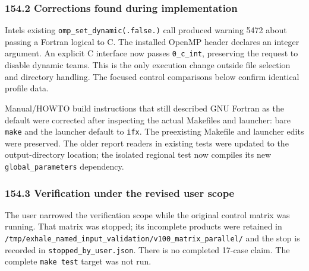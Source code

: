 \documentclass[english,a4paper]{my_memo}
\begin{document}
\subsubsection{154.2 Corrections found during implementation}\label{1542-corrections-found-during-implementation}

Intel\textquotesingle s existing \texttt{omp\_set\_dynamic(.false.)} call produced warning 5472 about
passing a Fortran logical to C. The installed OpenMP header declares an
integer argument. An explicit C interface now passes \texttt{0\_c\_int}, preserving
the request to disable dynamic teams. This is the only execution change
outside file selection and directory handling. The focused control
comparisons below confirm identical profile data.

Manual/HOWTO build instructions that still described GNU Fortran as the
default were corrected after inspecting the actual Makefiles and launcher:
bare \texttt{make} and the launcher default to \texttt{ifx}. The preexisting Makefile and
launcher edits were preserved. The older report readers in existing tests
were updated to the output-directory location; the isolated regional test
now compiles its new \texttt{global\_parameters} dependency.

\subsubsection{154.3 Verification under the revised user scope}\label{1543-verification-under-the-revised-user-scope}

The user narrowed the verification scope while the original control matrix
was running. That matrix was stopped; its incomplete products were retained
in \texttt{/tmp/exhale\_named\_input\_validation/v100\_matrix\_parallel/} and the stop
is recorded in \texttt{stopped\_by\_user.json}. There is no completed 17-case claim.
The complete \texttt{make\ test} target was not run.
\end{document}
